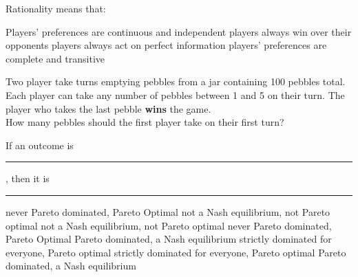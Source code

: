 \begin{question}
  Rationality means that:
  \begin{tasks}
    \task Players' preferences are continuous and independent
    \task players always win over their opponents
    \task players always act on perfect information
    \task \correct players' preferences are complete and transitive
  \end{tasks}
\end{question}

\begin{question}
  Two player take turns emptying pebbles from a jar containing 100 pebbles total.
  Each player can take any number of pebbles between 1 and 5 on their turn.
  The player who takes the last pebble \textbf{wins} the game. \\
  How many pebbles should the first player take on their first turn?
  \begin{tasks}
    \task {}
    \task {}
    \task {}
    \task {} 
    \task {}
  \end{tasks}
\end{question}

\begin{question}
  If an outcome is \rule{1cm}{0.15mm}, 
  then it is \rule{1cm}{0.15mm}
  \begin{tasks}
    \task \vary
    {\correct never Pareto dominated, Pareto Optimal}
    {not a Nash equilibrium, not Pareto optimal} 
    \task \vary
    {not a Nash equilibrium, not Pareto optimal} 
    {\correct never Pareto dominated, Pareto Optimal}
    \task \vary
    {Pareto dominated, a Nash equilibrium}
    {strictly dominated for everyone, Pareto optimal}
    \task \vary
    {strictly dominated for everyone, Pareto optimal}
    {Pareto dominated, a Nash equilibrium}
  \end{tasks}
\end{question}

